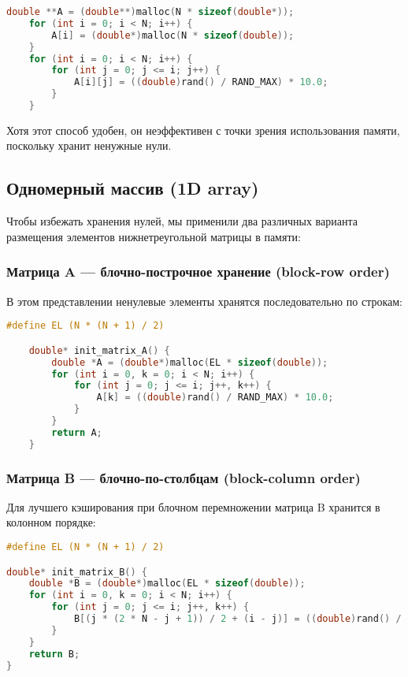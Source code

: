 \documentclass[14pt, russian]{matmex-diploma-custom}
\begin{document}
\begin{lstlisting}[language=C, caption={Инициализация нижнетреугольной матрицы в 2D массиве}]
    double **A = (double**)malloc(N * sizeof(double*));
    for (int i = 0; i < N; i++) {
        A[i] = (double*)malloc(N * sizeof(double));
    }
    for (int i = 0; i < N; i++) {
        for (int j = 0; j <= i; j++) {
            A[i][j] = ((double)rand() / RAND_MAX) * 10.0;
        }
    }
\end{lstlisting}

Хотя этот способ удобен, он неэффективен с точки зрения использования памяти, поскольку хранит ненужные нули.

\subsection{Одномерный массив (1D array)}

Чтобы избежать хранения нулей, мы применили два различных варианта размещения элементов нижнетреугольной матрицы в памяти:

\subsubsection*{Матрица A — блочно-построчное хранение (block-row order)}

В этом представлении ненулевые элементы хранятся последовательно по строкам:

{\footnotesize
\begin{lstlisting}[language=C, caption={Инициализация матрицы A в 1D массиве}]
    #define EL (N * (N + 1) / 2)

    double* init_matrix_A() {
        double *A = (double*)malloc(EL * sizeof(double));
        for (int i = 0, k = 0; i < N; i++) {
            for (int j = 0; j <= i; j++, k++) {
                A[k] = ((double)rand() / RAND_MAX) * 10.0;
            }
        }
        return A;
    }
\end{lstlisting}
}

\subsubsection*{Матрица B — блочно-по-столбцам (block-column order)}

Для лучшего кэширования при блочном перемножении матрица B хранится в колонном порядке:

{\footnotesize
\begin{lstlisting}[language=C, caption={Инициализация матрицы B в 1D массиве}]
#define EL (N * (N + 1) / 2)

double* init_matrix_B() {
    double *B = (double*)malloc(EL * sizeof(double));
    for (int i = 0, k = 0; i < N; i++) {
        for (int j = 0; j <= i; j++, k++) {
            B[(j * (2 * N - j + 1)) / 2 + (i - j)] = ((double)rand() / RAND_MAX) * 10.0;
        }
    }
    return B;
}
\end{lstlisting}
}
\end{document}
